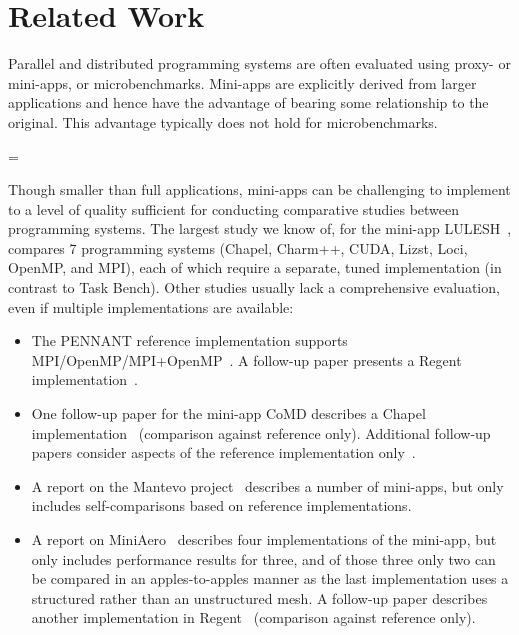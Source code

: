 \section{Related Work}
\label{sec:related-work}

{}

Parallel and distributed programming systems are often
evaluated using proxy- or mini-apps, or
microbenchmarks. Mini-apps are explicitly derived from larger
applications and hence have the advantage of bearing some
relationship to the original. This advantage typically does not hold
for microbenchmarks.

\brokenpenalty=\oldbrokenpenalty

Though smaller than full applications, mini-apps can be challenging to
implement to a level of quality sufficient for conducting comparative
studies between programming systems. The largest study we know of,
for the mini-app LULESH~\cite{LULESH13}, compares 7 programming
systems (Chapel, Charm++, CUDA, Lizst, Loci, OpenMP, and MPI), each of
which require a separate, tuned implementation (in contrast to
Task Bench). Other
studies usually lack a comprehensive evaluation, even if multiple
implementations are available:

\begin{itemize}

\item
The PENNANT reference implementation supports
MPI/OpenMP/MPI+OpenMP~\cite{PENNANT}. A follow-up paper presents a
Regent implementation~\cite{Regent15}.

\item
One follow-up paper for the mini-app CoMD describes a Chapel
implementation~\cite{CoMDChapel16} (comparison against reference
only). Additional follow-up papers consider aspects of the reference
implementation only~\cite{CoMDLoadImbalance17,
  CoMDThreadedModels14}.

\item
A report on the Mantevo project~\cite{Mantevo09} describes a number of
mini-apps, but only includes self-comparisons based on reference
implementations.

\item
A report on MiniAero~\cite{SandiaReportManyTaskRuntimes15} describes
four implementations of the mini-app, but only includes performance
results for three, and of those three only two can be compared in an
apples-to-apples manner as the last implementation uses a structured
rather than an unstructured mesh. A follow-up paper describes another
implementation in Regent~\cite{Regent15} (comparison against reference
only).

\end{itemize}


